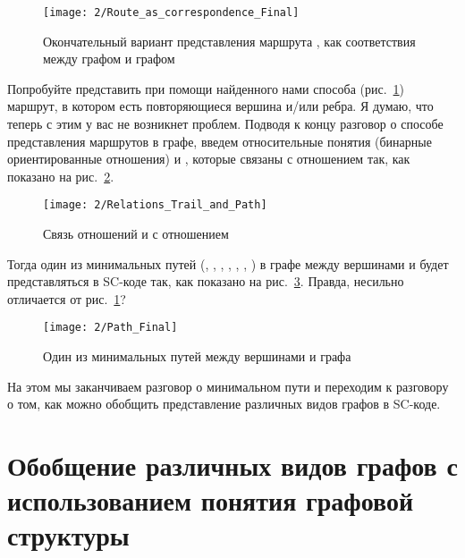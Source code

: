 \begin{figure}[h!]
  \centering
  \texttt{[image: 2/Route\_as\_correspondence\_Final]}
  \caption{Окончательный вариант представления маршрута , как
    соответствия между графом  и графом }
  \label{fig:Route_as_correspondence_Final}
\end{figure}

Попробуйте представить при помощи найденного нами способа
(рис.~\ref{fig:Route_as_correspondence_Final}) маршрут, в котором есть
повторяющиеся вершина и/или ребра. Я думаю, что теперь с этим у вас не
возникнет проблем. Подводя к концу разговор о способе представления
маршрутов в графе, введем относительные понятия (бинарные
ориентированные отношения)  и , которые
связаны с отношением  так, как показано на
рис.~\ref{fig:Relations_Trail_and_Path}.

\begin{figure}[h!]
  \centering
  \texttt{[image: 2/Relations\_Trail\_and\_Path]}
  \caption{Связь отношений  и  с отношением
    }
  \label{fig:Relations_Trail_and_Path}
\end{figure}

Тогда один из минимальных путей  (, ,
, , , , ) в графе
 между вершинами  и  будет представляться в
SC-коде так, как показано на рис.~\ref{fig:Path_Final}. Правда,
несильно отличается от рис.~\ref{fig:Route_as_correspondence_Final}?

\begin{figure}[h!]
  \centering
  \texttt{[image: 2/Path\_Final]}
  \caption{Один из минимальных путей  между вершинами 
    и  графа }
  \label{fig:Path_Final}
\end{figure}

На этом мы заканчиваем разговор о минимальном пути и переходим к
разговору о том, как можно обобщить представление различных видов
графов в SC-коде.

\section{Обобщение различных видов графов с использованием понятия
  графовой структуры}
\label{sec:onto_graph_struct}

